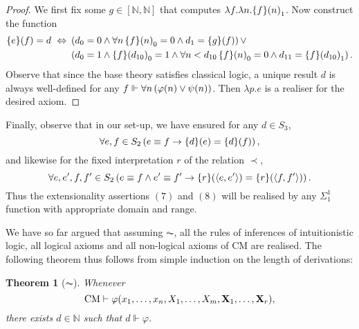 \documentclass[11pt]{article}
\theoremstyle{plain}
\newtheorem{theorem}{Theorem}[section]
\theoremstyle{definition}
\newcommand{\tuple}[1]{\left\langle #1 \right\rangle}
\begin{document}
\begin{proof}
    We first fix some $g \in \left[\mathbb{N}, \mathbb{N}\right]$ that computes $\lambda f. \lambda n. \mleft\{f\mright\}\mleft(n\mright)_1$. Now construct the function
    \begin{align*}
        \mleft\{e\mright\}\mleft(f\mright) = d \ \ratio\Leftrightarrow \  & \left(d_0 = 0 \land \forall n \, \mleft\{f\mright\}\mleft(n\mright)_0 = 0 \land d_1 = \mleft\{g\mright\}\mleft(f\mright)\right) \lor                                                                    \\
                                                                          & \left(d_0 = 1 \land \mleft\{f\mright\}\mleft(d_{10}\mright)_0 = 1 \land \forall n < d_{10} \, \mleft\{f\mright\}\mleft(n\mright)_0 = 0 \land d_{11} = \mleft\{f\mright\}\mleft(d_{10}\mright)_1\right).
    \end{align*}
    Observe that since the base theory satisfies classical logic, a unique result $d$ is always well-defined for any $f \Vdash \forall n \left(\varphi\mleft(n\mright) \lor \psi\mleft(n\mright)\right)$. Then $\lambda p. e$ is a realiser for the desired axiom.
\end{proof}

Finally, observe that in our set-up, we have ensured for any $d \in S_3$,
\[\forall e, f \in S_2 \left(e \equiv f \rightarrow \mleft\{d\mright\}\mleft(e\mright) = \mleft\{d\mright\}\mleft(f\mright)\right),\]
and likewise for the fixed interpretation $r$ of the relation $\prec$,
\[\forall e, e', f, f' \in S_2 \left(e \equiv f \land e' \equiv f' \rightarrow \mleft\{r\mright\}\mleft(\tuple{e, e'}\mright) = \mleft\{r\mright\}\mleft(\tuple{f, f'}\mright)\right).\]
Thus the extensionality assertions $\left(7\right)$ and $\left(8\right)$ will be realised by any $\Sigma^1_1$ function with appropriate domain and range.

We have so far argued that assuming $\AC$, all the rules of inferences of intuitionistic logic, all logical axioms and all non-logical axioms of $\mathrm{CM}$ are realised. The following theorem thus follows from simple induction on the length of derivations:

\begin{theorem}[$\AC$]
    Whenever
    \[\mathrm{CM} \vdash \varphi\mleft(x_1, \ldots, x_n, X_1, \ldots, X_m, \mathbf{X}_1, \ldots, \mathbf{X}_r\mright),\]
    there exists $d \in \mathbb{N}$ such that $d \Vdash \varphi$.
\end{theorem}
\end{document}
